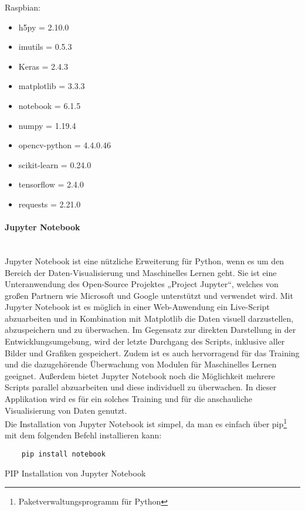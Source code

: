 Raspbian:

\begin{itemize}
    \item h5py = 2.10.0
    \item imutils = 0.5.3
    \item Keras = 2.4.3
    \item matplotlib = 3.3.3
    \item notebook = 6.1.5
    \item numpy = 1.19.4
    \item opencv-python = 4.4.0.46
    \item scikit-learn = 0.24.0
    \item tensorflow = 2.4.0
    \item requests = 2.21.0
\end{itemize}

\paragraph{Jupyter Notebook}\mbox{}\\
Jupyter Notebook ist eine nützliche Erweiterung für Python, wenn es um den Bereich der Daten-Visualisierung und Maschinelles Lernen geht. 
Sie ist eine Unteranwendung des Open-Source Projektes „Project Jupyter“, welches von großen Partnern wie Microsoft und Google unterstützt 
und verwendet wird. Mit Jupyter Notebook ist es möglich in einer Web-Anwendung ein Live-Script abzuarbeiten und in Kombination mit Matplotlib 
die Daten visuell darzustellen, abzuspeichern und zu überwachen. Im Gegensatz zur direkten Darstellung in der Entwicklungsumgebung, wird 
der letzte Durchgang des Scripts, inklusive aller Bilder und Grafiken gespeichert. Zudem ist es auch hervorragend für das Training und 
die dazugehörende Überwachung von Modulen für Maschinelles Lernen geeignet. Außerdem bietet Jupyter Notebook noch die Möglichkeit mehrere Scripts 
parallel abzuarbeiten und diese individuell zu überwachen. In dieser Applikation wird es für ein solches Training und für die anschauliche 
Visualisierung von Daten genutzt.\\

Die Installation von Jupyter Notebook ist simpel, da man es einfach über pip\footnote{Paketverwaltungsprogramm für Python} mit dem folgenden Befehl installieren kann:

\begin{listing}[H]
    \begin{verbatim}
    pip install notebook
    \end{verbatim}
    \caption{PIP Installation von Jupyter Notebook}
\end{listing}

